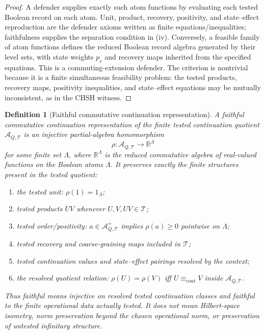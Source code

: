 \documentclass[11pt]{article}
\newtheorem{definition}[theorem]{Definition}
\newcommand{\R}{\mathbb R}
\newcommand{\AQtest}{\mathcal A_{Q,\mathcal T}}
\begin{document}
\begin{proof}
A defender supplies exactly such atom functions by evaluating each tested Boolean record on each atom.  Unit, product, recovery, positivity, and state--effect reproduction are the defender axioms written as finite equations/inequalities; faithfulness supplies the separation condition in (iv).  Conversely, a feasible family of atom functions defines the reduced Boolean record algebra generated by their level sets, with state weights $p_s$ and recovery maps inherited from the specified equations.  This is a commuting-extension defender.  The criterion is nontrivial because it is a finite simultaneous feasibility problem: the tested products, recovery maps, positivity inequalities, and state--effect equations may be mutually inconsistent, as in the CHSH witness.
\end{proof}

\begin{definition}[Faithful commutative continuation representation]\label{def:faithful-commutative-representation}
A faithful commutative continuation representation of the finite tested continuation quotient $\AQtest$ is an injective partial-algebra homomorphism
\[
 \rho:\AQtest\to \R^\Lambda
\]
for some finite set $\Lambda$, where $\R^\Lambda$ is the reduced commutative algebra of real-valued functions on the Boolean atoms $\Lambda$.
It preserves exactly the finite structures present in the tested quotient:
\begin{enumerate}[label=(\roman*),leftmargin=2em]
\item the tested unit: $\rho(1)=1_\Lambda$;
\item tested products $UV$ whenever $U,V,UV\in\mathcal T$;
\item tested order/positivity: $a\in\AQtest^+$ implies $\rho(a)\geq0$ pointwise on $\Lambda$;
\item tested recovery and coarse-graining maps included in $\mathcal T$;
\item tested continuation values and state--effect pairings resolved by the context;
\item the resolved quotient relation: $\rho(U)=\rho(V)$ iff $U\equiv_{\mathrm{cont}}V$ inside $\AQtest$.
\end{enumerate}
Thus \emph{faithful} means injective on resolved tested continuation classes and faithful to the finite operational data actually tested.  It does not mean Hilbert-space isometry, norm preservation beyond the chosen operational norm, or preservation of untested infinitary structure.
\end{definition}
\end{document}
